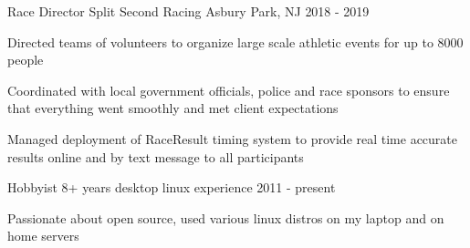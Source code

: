 
\begin{cventries}
  \cventry
    {Race Director} %
    {Split Second Racing} %
    {Asbury Park, NJ} %
    {2018 - 2019} %
    {
      \begin{cvitems} %
        \item {Directed teams of volunteers to organize large scale athletic events for up to 8000 people}
		\item {Coordinated with local government officials, police and race sponsors to ensure that everything went smoothly and met client expectations}
		\item {Managed deployment of RaceResult timing system to provide real time accurate results online and by text message to all participants}
      \end{cvitems}
    }

  \cventry
    {Hobbyist} %
    {8+ years desktop linux experience} %
    {} %
    {2011 - present} %
    {
      \begin{cvitems} %
        \item {Passionate about open source, used various linux distros on my laptop and on home servers}
      \end{cvitems}
    }

\end{cventries}
